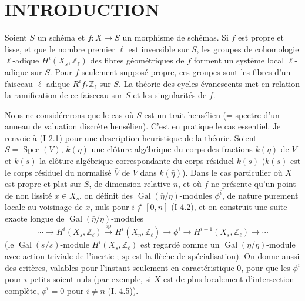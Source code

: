 \section*{INTRODUCTION}

Soient $S$ un schéma et $f:X\longrightarrow S$ un morphisme de schémas.
Si $f$ est propre et lisse, et que le nombre premier $\ell$ est inversible
sur $S$, les groupes de cohomologie $\ell$-adique
$H^i(X_{\bar s},\mathbb Z_\ell)$ des fibres géométriques de $f$ forment
un système local $\ell$-adique sur $S$. Pour $f$ seulement supposé propre,
ces groupes sont les fibres d'un faisceau $\ell$-adique
$R^if_*\mathbb Z_\ell$ sur $S$. La \underline{théorie des cycles évanescents}
met en relation la ramification de ce faisceau sur $S$ et les singularités de $f$.

Nous ne considérerons que le cas où $S$ est un trait hensélien
(= spectre d'un anneau de valuation discrète hensélien). C'est en pratique
le cas essentiel. Je renvoie à (I 2.1) pour une description heuristique
de la théorie. Soient $S=\operatorname{Spec}(V)$, $k(\bar\eta)$ une clôture
algébrique du corps des fractions $k(\eta)$ de $V$ et $k(\bar s)$ la clôture
algébrique correspondante du corps résiduel $k(s)$
($k(\bar s)$ est le corps résiduel du normalisé $\bar V$ de $V$ dans
$k(\bar\eta)$). Dans le cas particulier où $X$ est propre et plat sur $S$,
de dimension relative $n$, et où $f$ ne présente qu'un point de non lissité
$x\in X_s$, on définit des $\operatorname{Gal}(\bar\eta/\eta)$-modules
$\phi^i$, de nature purement locale au voisinage de $x$, nuls pour
$i\notin[0,n]$ (I 4.2), et on construit une suite exacte longue de
$\operatorname{Gal}(\bar\eta/\eta)$-modules
\[
\cdots\longrightarrow H^i(X_{\bar s},\mathbb Z_\ell)
\xrightarrow{\mathrm{sp}}H^i(X_{\bar\eta},\mathbb Z_\ell)
\longrightarrow\phi^i\longrightarrow
H^{i+1}(X_{\bar s},\mathbb Z_\ell)\longrightarrow\cdots
\]
(le $\operatorname{Gal}(\bar s/s)$-module $H^i(X_{\bar s},\mathbb Z_\ell)$
est regardé comme un $\operatorname{Gal}(\bar\eta/\eta)$-module avec action
triviale de l'inertie ; $\mathrm{sp}$ est la flèche de spécialisation).
On donne aussi des critères, valables pour l'instant seulement en
caractéristique $0$, pour que les $\phi^i$ pour $i$ petits soient nuls
(par exemple, si $X$ est de plus localement d'intersection complète,
$\phi^i=0$ pour $i\ne n$ (I. 4.5)).

